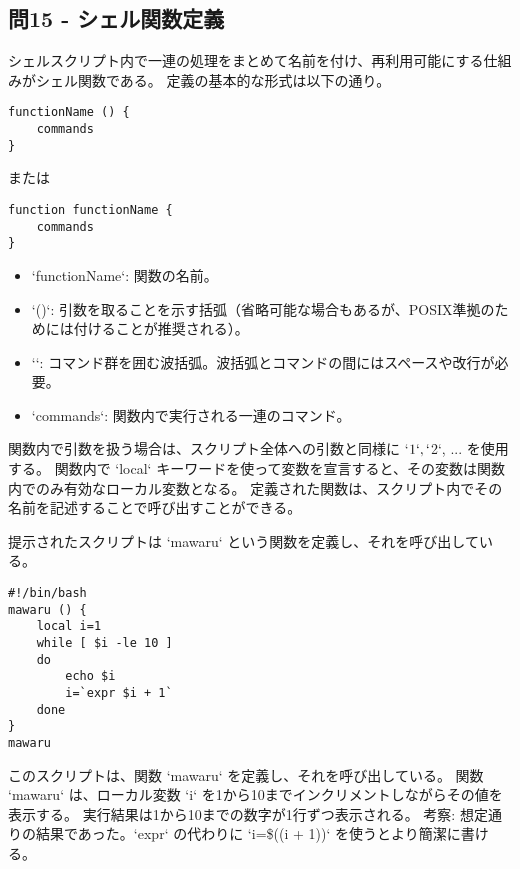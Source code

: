 \documentclass[a4paper,11pt]{jsarticle}
\begin{document}
\subsection*{問15 - シェル関数定義}
シェルスクリプト内で一連の処理をまとめて名前を付け、再利用可能にする仕組みがシェル関数である。
定義の基本的な形式は以下の通り。
\begin{lstlisting}[caption=問15 シェル関数定義の形式]
functionName () {
    commands
}
\end{lstlisting}
または
\begin{lstlisting}
function functionName {
    commands
}
\end{lstlisting}
\begin{itemize}
    \item `functionName`: 関数の名前。
    \item `()`: 引数を取ることを示す括弧（省略可能な場合もあるが、POSIX準拠のためには付けることが推奨される）。
    \item `{}`: コマンド群を囲む波括弧。波括弧とコマンドの間にはスペースや改行が必要。
    \item `commands`: 関数内で実行される一連のコマンド。
\end{itemize}
関数内で引数を扱う場合は、スクリプト全体への引数と同様に `$1`, `$2`, ... を使用する。
関数内で `local` キーワードを使って変数を宣言すると、その変数は関数内でのみ有効なローカル変数となる。
定義された関数は、スクリプト内でその名前を記述することで呼び出すことができる。

提示されたスクリプトは `mawaru` という関数を定義し、それを呼び出している。
\begin{lstlisting}[caption=問15のスクリプト例]
#!/bin/bash
mawaru () {
    local i=1
    while [ $i -le 10 ]
    do
        echo $i
        i=`expr $i + 1`
    done
}
mawaru
\end{lstlisting}
このスクリプトは、関数 `mawaru` を定義し、それを呼び出している。
関数 `mawaru` は、ローカル変数 `i` を1から10までインクリメントしながらその値を表示する。
実行結果は1から10までの数字が1行ずつ表示される。
考察: 想定通りの結果であった。`expr` の代わりに `i=\$((i + 1))` を使うとより簡潔に書ける。
\end{document}
